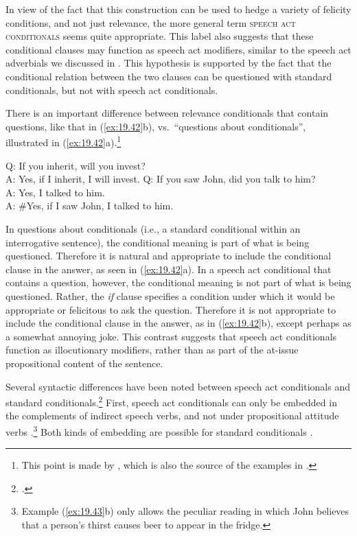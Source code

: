 In view of the fact that this construction can be used to hedge a variety of felicity conditions, and not just relevance, the more general term \textsc{speech act conditionals} seems quite appropriate. This label also suggests that these conditional clauses may function as speech act modifiers, similar to the speech act adverbials we discussed in . This hypothesis is supported by the fact that the conditional relation between the two clauses can be questioned with standard conditionals, but not with speech act conditionals.



There is an important difference between relevance conditionals that contain questions, like that in (\ref{ex:19.42}b), vs.~“questions about conditionals”, illustrated in (\ref{ex:19.42}a).\footnote{This point is made by \citet{vanderAuwera1986}, which is also the source of the examples in .}


\ea \label{ex:19.42}
\ea   Q: If you inherit, will you invest?\\
A: Yes, if I inherit, I will invest.
\ex  Q: If you saw John, did you talk to him?\\
A: Yes, I talked to him.\\
A: \#Yes, if I saw John, I talked to him.
\z \z


In questions about conditionals (i.e., a standard conditional within an interrogative sentence), the conditional meaning is part of what is being questioned. Therefore it is natural and appropriate to include the conditional clause in the answer, as seen in (\ref{ex:19.42}a). In a speech act conditional that contains a question, however, the conditional meaning is not part of what is being questioned. Rather, the \textit{if} clause specifies a condition under which it would be appropriate or felicitous to ask the question. Therefore it is not appropriate to include the conditional clause in the answer, as in (\ref{ex:19.42}b), except perhaps as a somewhat annoying joke. This contrast suggests that speech act conditionals function as illocutionary modifiers, rather than as part of the at-issue propositional content of the sentence.


Several syntactic differences have been noted between speech act conditionals and standard conditionals.\footnote{\citet{BhattPancheva2006}.} First, speech act conditionals can only be embedded in the complements of indirect speech verbs, and not under propositional attitude verbs .\footnote{Example (\ref{ex:19.43}b) only allows the peculiar reading in which John believes that a person's thirst causes beer to appear in the fridge.} Both kinds of embedding are possible for standard conditionals .


